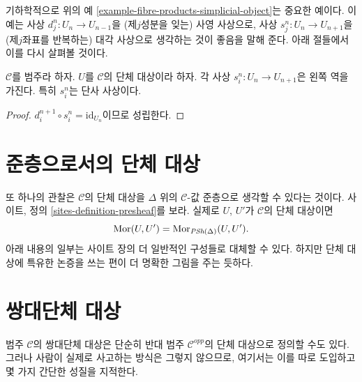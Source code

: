 \noindent
기하학적으로 위의 예 \ref{example-fibre-products-simplicial-object}는
중요한 예이다. 이 예는 사상 $d^n_j : U_n \to U_{n - 1}$을
(제$j$성분을 잊는) 사영 사상으로, 사상
$s^n_j : U_n \to U_{n + 1}$을 (제$j$좌표를 반복하는)
대각 사상으로 생각하는 것이 좋음을 말해 준다.
아래 절들에서 이를 다시 살펴볼 것이다.

\begin{lemma}
\label{lemma-si-injective}
$\mathcal{C}$를 범주라 하자.
$U$를 $\mathcal{C}$의 단체 대상이라 하자.
각 사상 $s^n_i : U_n \to U_{n + 1}$은 왼쪽 역을 가진다.
특히 $s^n_i$는 단사 사상이다.
\end{lemma}

\begin{proof}
$d_i^{n + 1} \circ s^n_i = \text{id}_{U_n}$이므로 성립한다.
\end{proof}

\section{준층으로서의 단체 대상}
\label{section-simplicial-presheaves}

\noindent
또 하나의 관찰은 $\mathcal{C}$의 단체 대상을 $\Delta$ 위의
$\mathcal{C}$-값 준층으로 생각할 수 있다는 것이다.
사이트, 정의 \ref{sites-definition-presheaf}를 보라.
실제로 $U$, $U'$가 $\mathcal{C}$의 단체 대상이면
\begin{equation}
\label{equation-simplicial-set-presheaf}
\mathop{\mathrm{Mor}}\nolimits(U, U') = \mathop{\mathrm{Mor}}\nolimits_{\textit{PSh}(\Delta)}(U, U').
\end{equation}
아래 내용의 일부는 사이트 장의 더 일반적인 구성들로 대체할 수 있다.
하지만 단체 대상에 특유한 논증을 쓰는 편이 더 명확한 그림을
주는 듯하다.















\section{쌍대단체 대상}
\label{section-cosimplicial-object}

\noindent
범주 $\mathcal{C}$의 쌍대단체 대상은 단순히 반대 범주
$\mathcal{C}^{opp}$의 단체 대상으로 정의할 수도 있다.
그러나 사람이 실제로 사고하는 방식은 그렇지 않으므로,
여기서는 이를 따로 도입하고 몇 가지 간단한 성질을 지적한다.


